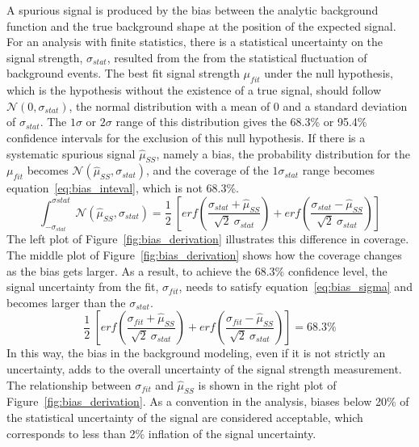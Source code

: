 A spurious signal is produced by the bias between the analytic background function and the true background shape at the position of the expected signal.
For an analysis with finite statistics, there is a statistical uncertainty on the signal strength, $\sigma_{stat}$,
resulted from the from the statistical fluctuation of background events.
The best fit signal strength $\mu_{fit}$ under the null hypothesis, which is the hypothesis without the existence of a true signal,
should follow $\mathcal{N}(0, \sigma_{stat})$, the normal distribution with a mean of 0 and a standard deviation of $\sigma_{stat}$.
The $1\sigma$ or $2\sigma$ range of this distribution gives the 68.3\% or 95.4\% confidence intervals for the exclusion of this null hypothesis.
If there is a systematic spurious signal $\hat{\mu}_{SS}$, namely a bias, the probability distribution for the $\mu_{fit}$ becomes $\mathcal{N}(\hat{\mu}_{SS}, \sigma_{stat})$,
and the coverage of the $1\sigma_{stat}$ range becomes equation~\ref{eq:bias_inteval}, which is not 68.3\%.
\begin{equation}\label{eq:bias_inteval}
  \int_{-\sigma_{stat}}^{\sigma{stat}} \mathcal{N}(\hat{\mu}_{SS}, \sigma_{stat}) = \frac{1}{2} ~[erf(\frac{\sigma_{stat}+\hat{\mu}_{SS}}{\sqrt{2}~\sigma_{stat}}) + erf(\frac{\sigma_{stat}-\hat{\mu}_{SS}}{\sqrt{2}~\sigma_{stat}})]
\end{equation}
The left plot of Figure~\ref{fig:bias_derivation} illustrates this difference in coverage.
The middle plot of Figure~\ref{fig:bias_derivation} shows how the coverage changes as the bias gets larger.  
As a result, to achieve the 68.3\% confidence level, the signal uncertainty from the fit, $\sigma_{fit}$, 
needs to satisfy equation~\ref{eq:bias_sigma} and becomes larger than the $\sigma_{stat}$. 
\begin{equation}\label{eq:bias_sigma}
  \frac{1}{2} ~[erf(\frac{\sigma_{fit}+\hat{\mu}_{SS}}{\sqrt{2}~\sigma_{stat}}) + erf(\frac{\sigma_{fit}-\hat{\mu}_{SS}}{\sqrt{2}~\sigma_{stat}})] = 68.3\%
\end{equation}
In this way, the bias in the background modeling, even if it is not strictly an uncertainty, 
adds to the overall uncertainty of the signal strength measurement.
The relationship between $\sigma_{fit}$ and $\hat{\mu}_{SS}$ is shown in the right plot of Figure~\ref{fig:bias_derivation}.
As a convention in the \hmm analysis, biases below 20\% of the statistical uncertainty of the signal are considered acceptable,
which corresponds to less than 2\% inflation of the signal uncertainty.

